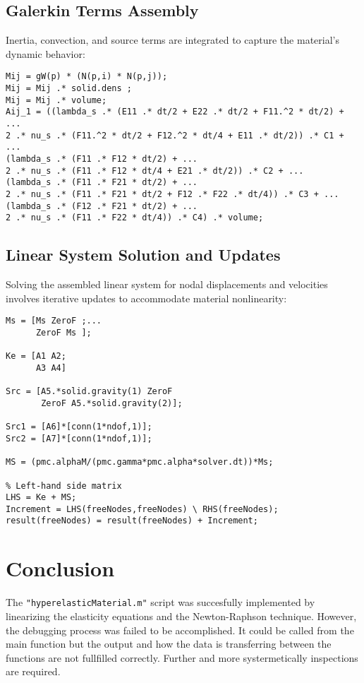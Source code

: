 \documentclass[a4paper,12pt]{article} %
\begin{document}
\subsection*{Galerkin Terms Assembly}
Inertia, convection, and source terms are integrated to capture the material's dynamic behavior:
\begin{verbatim}
Mij = gW(p) * (N(p,i) * N(p,j));
Mij = Mij .* solid.dens ;
Mij = Mij .* volume;
Aij_1 = ((lambda_s .* (E11 .* dt/2 + E22 .* dt/2 + F11.^2 * dt/2) + ...
2 .* nu_s .* (F11.^2 * dt/2 + F12.^2 * dt/4 + E11 .* dt/2)) .* C1 + ...
(lambda_s .* (F11 .* F12 * dt/2) + ...
2 .* nu_s .* (F11 .* F12 * dt/4 + E21 .* dt/2)) .* C2 + ...
(lambda_s .* (F11 .* F21 * dt/2) + ...
2 .* nu_s .* (F11 .* F21 * dt/2 + F12 .* F22 .* dt/4)) .* C3 + ...
(lambda_s .* (F12 .* F21 * dt/2) + ...
2 .* nu_s .* (F11 .* F22 * dt/4)) .* C4) .* volume;
\end{verbatim}


\subsection*{Linear System Solution and Updates}
Solving the assembled linear system for nodal displacements and velocities involves iterative updates to accommodate material nonlinearity:
\begin{verbatim}
Ms = [Ms ZeroF ;...
      ZeroF Ms ];

Ke = [A1 A2;
      A3 A4]

Src = [A5.*solid.gravity(1) ZeroF
       ZeroF A5.*solid.gravity(2)];

Src1 = [A6]*[conn(1*ndof,1)];
Src2 = [A7]*[conn(1*ndof,1)];
   
MS = (pmc.alphaM/(pmc.gamma*pmc.alpha*solver.dt))*Ms;

% Left-hand side matrix
LHS = Ke + MS;
Increment = LHS(freeNodes,freeNodes) \ RHS(freeNodes);
result(freeNodes) = result(freeNodes) + Increment;
\end{verbatim}

\section*{Conclusion}
The \texttt{"hyperelasticMaterial.m"} script was succesfully implemented by linearizing the elasticity equations and the Newton-Raphson technique. 
However, the debugging process was failed to be accomplished. It could be called from the main function but the output and how the data is transferring between the functions are not fullfilled correctly.
Further and more systermetically inspections are required.
\end{document}
